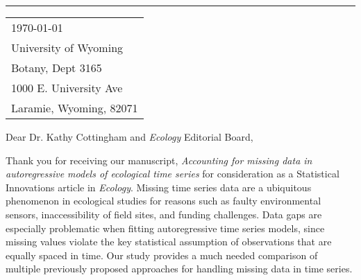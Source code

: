 \documentclass{article}
\begin{document}


\vspace{-1em} %

\rule{\linewidth}{1pt} %

\bigskip %


\hfill
\begin{tabular}{l @{}}
	\today \bigskip\\ %
	University of Wyoming\\
	Botany, Dept 3165\\
    1000 E. University Ave\\
    Laramie, Wyoming, 82071\\
\end{tabular}

\bigskip %



\bigskip %

Dear Dr. Kathy Cottingham and \textit{Ecology} Editorial Board,

\mediumskip %



Thank you for receiving our manuscript, \textit{Accounting for missing data in autoregressive models of ecological time series} for consideration as a Statistical Innovations article in \textit{Ecology}. Missing time series data are a ubiquitous phenomenon in ecological studies for reasons such as faulty environmental sensors, inaccessibility of field sites, and funding challenges. Data gaps are especially problematic when fitting autoregressive time series models, since missing values violate the key statistical assumption of observations that are equally spaced in time. Our study provides a much needed comparison of multiple previously proposed approaches for handling missing data in time series. 
\end{document}
